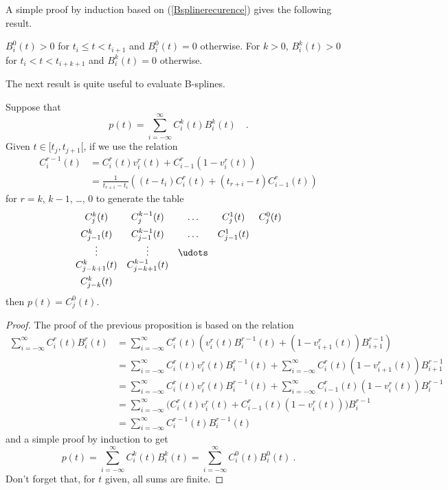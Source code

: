 A simple proof by induction based on (\ref{Bsplinerecurence}) gives
the following result.

\begin{prop}
$B_i^0(t) > 0$ for $t_i \leq t < t_{i+1}$ and $B_i^0(t) = 0$ otherwise.
For $k>0$, $B_i^k(t) > 0$ for $t_i < t < t_{i+k+1}$ and $B_i^k(t) = 0$
otherwise.
\label{Bsplienonneg}
\end{prop}

The next result is quite useful to evaluate B-splines.

\begin{prop}
Suppose that
\[
  p(t) = \sum_{i=-\infty}^\infty C_i^k(t) B_i^k(t) \quad .
\]
Given $t \in [t_j ,t_{j+1}[$, if we use the relation
\begin{equation}\label{table_spline}
\begin{split}
  C_i^{r-1}(t) &= C_i^r(t) v_i^r(t) + C_{i-1}^r \left( 1-   v_i^r(t)\right) \\
&= \frac{1}{t_{r+i}-t_i} \left( (t-t_i) C_i^r(t) +
  (t_{r+i}-t) C_{i-1}^r(t) \right)
\end{split}
\end{equation}
for $r=k$, $k-1$, \ldots, $0$ to generate the table
\[
\begin{array}{*{4}{c@{\hspace{1em}}}c}
C_j^k(t) & C_j^{k-1}(t) & \ldots & C_j^1(t) & C_j^0(t) \\[0.5em]
C_{j-1}^k(t) & C_{j-1}^{k-1}(t) & \ldots & C_{j-1}^1(t) & \\ 
\vdots & \vdots & \udots &  & \\
C_{j-k+1}^k(t) & C_{j-k+1}^{k-1}(t) & & & \\[0.5em]
C_{j-k}^k(t) & & & & 
\end{array}
\]
then $p(t) = C_j^0(t)$.
\end{prop}

\begin{proof}
The proof of the previous proposition is based on the relation
\begin{align*}
\sum_{i=-\infty}^\infty C_i^r(t) B_i^r(t)
&= \sum_{i=-\infty}^\infty C_i^r(t) \left( v_i^r(t) B_i^{r-1}(t)
+ \left( 1-v_{i+1}^r(t) \right) B_{i+1}^{r-1}\right) \\
&= \sum_{i=-\infty}^\infty C_i^r(t) v_i^r(t) B_i^{r-1}(t)
+ \sum_{i=-\infty}^\infty C_i^r(t) \left( 1-v_{i+1}^r(t) \right) B_{i+1}^{r-1} \\
&= \sum_{i=-\infty}^\infty C_i^r(t) v_i^r(t) B_i^{r-1}(t)
+ \sum_{i=-\infty}^\infty C_{i-1}^r(t) \left( 1-v_i^r(t) \right) B_i^{r-1} \\
&= \sum_{i=-\infty}^\infty \big( C_i^r(t) v_i^r(t) 
+  C_{i-1}^r(t) \left( 1-v_i^r(t) \right) \big) B_i^{r-1} \\
&= \sum_{i=-\infty}^\infty C_i^{r-1}(t) B_i^{r-1}(t)
\end{align*}
and a simple proof by induction to get
\[
p(t) = \sum_{i=-\infty}^\infty C_i^k(t) B_i^k(t)
= \sum_{i=-\infty}^\infty C_i^0(t) B_i^0(t) \ .
\]
Don't forget that, for $t$ given, all sums are finite.
\end{proof}

